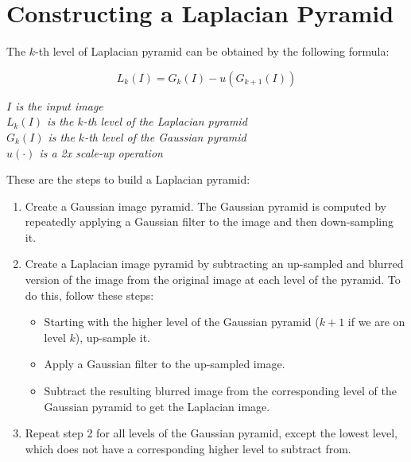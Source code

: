 \documentclass{article}
\begin{document}
\newpage

\section*{Constructing a Laplacian Pyramid}

The $k$-th level of Laplacian pyramid can be obtained by the following formula:

\begin{equation*}
    L_k(I) = G_k(I) - u(G_{k+1}(I))
\end{equation*}

\begin{center}
    \textit{$I$ is the input image} \\
    \textit{$L_k(I)$ is the $k$-th level of the Laplacian pyramid} \\
    \textit{$G_k(I)$ is the $k$-th level of the Gaussian pyramid} \\
    \textit{$u(\cdot)$ is a 2x scale-up operation}
\end{center}

These are the steps to build a Laplacian pyramid:
\begin{enumerate}
    \item Create a Gaussian image pyramid. The Gaussian pyramid is computed by repeatedly applying a Gaussian filter to the image and then down-sampling it.
    \item Create a Laplacian image pyramid by subtracting an up-sampled and blurred version of the image from the original image at each level of the pyramid. To do this, follow these steps:
    \begin{itemize}
        \item Starting with the higher level of the Gaussian pyramid ($k + 1$ if we are on level $k$), up-sample it.
        \item Apply a Gaussian filter to the up-sampled image.
        \item Subtract the resulting blurred image from the corresponding level of the Gaussian pyramid to get the Laplacian image.        
    \end{itemize}
    \item Repeat step 2 for all levels of the Gaussian pyramid, except the lowest level, which does not have a corresponding higher level to subtract from.
\end{enumerate}

\newpage
\end{document}

